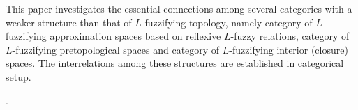 
This paper investigates the essential connections among several categories with a weaker structure than that of $L$-fuzzifying topology, namely category of $L$-fuzzifying approximation spaces based on reflexive $L$-fuzzy relations, category of $L$-fuzzifying pretopological spaces and category of $L$-fuzzifying interior (closure) spaces. The interrelations among these structures are established in categorical setup.

.

